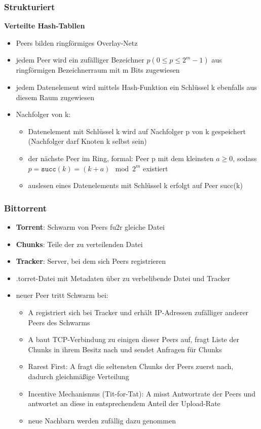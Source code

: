 		\subsubsection{Strukturiert}
			\textbf{Verteilte Hash-Tabllen}
			\begin{itemize}
  				\item Peers bilden ringförmiges Overlay-Netz
  				\item jedem Peer wird ein zufälliger Bezeichner $p(0\leq p\leq 2^m-1)$ aus ringförmigen Bezeichnerraum mit m Bits zugewiesen
  				\item jedem Datenelement wird mittels Hash-Funktion ein Schlüssel k ebenfalls aus diesem Raum zugewiesen
  				\item Nachfolger von k:
  					\begin{itemize}
  						\item Datenelement mit Schlüssel k wird auf Nachfolger p von k gespeichert (Nachfolger darf Knoten k selbst sein)
  						\item der nächste Peer im Ring, formal: Peer p mit dem kleinsten $a\geq0$, sodass $p=\texttt{succ}(k)=(k+a)\mod2^m$ existiert
  						\item auslesen eines Datenelements mit Schlüssel k erfolgt auf Peer succ(k)
					\end{itemize}
			\end{itemize}
		\subsubsection{Bittorrent}
			\begin{itemize}
				\item \textbf{Torrent}: Schwarm von Peers fu2r gleiche Datei
				\item \textbf{Chunks}: Teile der zu verteilenden Datei
				\item \textbf{Tracker}: Server, bei dem sich Peers registrieren
				\item .torret-Datei mit Metadaten über zu verbelibende Datei und Tracker
				\item neuer Peer tritt Schwarm bei:
					\begin{itemize}
						 \item A registriert sich bei Tracker und erhält IP-Adressen zufälliger anderer Peers des Schwarms
						 \item A baut TCP-Verbindung zu einigen dieser Peers auf, fragt Liste der Chunks in ihrem Besitz nach und sendet Anfragen für Chunks
						 \item Rarest First: A fragt die seltensten Chunks der Peers zuerst nach, dadurch gleichmäßige Verteilung
						 \item Incentive Mechanismus (Tit-for-Tat): A misst Antwortrate der Peers und antwortet an diese in entsprechendem Anteil der Upload-Rate
						 \item neue Nachbarn werden zufällig dazu genommen
					\end{itemize}
			\end{itemize}
